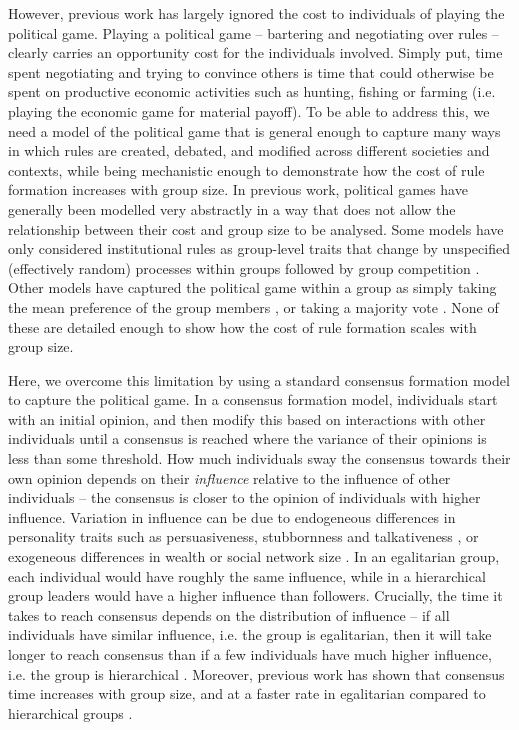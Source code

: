\documentclass{rstb}
\begin{document}
\begin{linenumbers}
However, previous work has largely ignored the cost to individuals of playing the political game. Playing a political game -- bartering and negotiating over rules -- clearly carries an opportunity cost for the individuals involved. Simply put, time spent negotiating and trying to convince others is time that could otherwise be spent on productive economic activities such as hunting, fishing or farming (i.e. playing the economic game for material payoff). To be able to address this, we need a model of the political game that is general enough to capture many ways in which rules are created, debated, and modified across different societies and contexts, while being mechanistic enough to demonstrate how the cost of rule formation increases with group size. In previous work, political games have generally been modelled very abstractly in a way that does not allow the relationship between their cost and group size to be analysed. Some models have only considered institutional rules as group-level traits that change by unspecified (effectively random) processes within groups followed by group competition \cite{Turchin:2013:a,Richerson:2016:a}. Other models have captured the political game within a group as simply taking the mean preference of the group members \cite{Powers:2013:a,Powers:2018:a}, or taking a majority vote \cite{Currie:2021:a}. None of these are detailed enough to show how the cost of rule formation scales with group size. 

Here, we overcome this limitation by using a standard consensus formation model \cite{Gavrilets:2016:a,Perret:2022:a} to capture the political game. In a consensus formation model, individuals start with an initial opinion, and then modify this based on interactions with other individuals until a consensus is reached where the variance of their opinions is less than some threshold. How much individuals sway the consensus towards their own opinion depends on their \emph{influence} relative to the influence of other individuals -- the consensus is closer to the opinion of individuals with higher influence. Variation in influence can be due to endogeneous differences in personality traits such as persuasiveness, stubbornness and talkativeness \cite{Johnstone:2011:a,Gavrilets:2016:a,Perret:2022:a}, or exogeneous differences in wealth or social network size \cite{vonReuden:2014:a}.  In an egalitarian group, each individual would have roughly the same influence, while in a hierarchical group leaders would have a higher influence than followers. Crucially, the time it takes to reach consensus depends on the distribution of influence -- if all individuals have similar influence, i.e. the group is egalitarian, then it will take longer to reach consensus than if a few individuals have much higher influence, i.e. the group is hierarchical \cite{Gavrilets:2016:a,Perret:2020:a}. Moreover, previous work has shown that consensus time increases with group size, and at a faster rate in egalitarian compared to hierarchical groups \cite{Perret:2020:a}.


\end{linenumbers}
\end{document}

